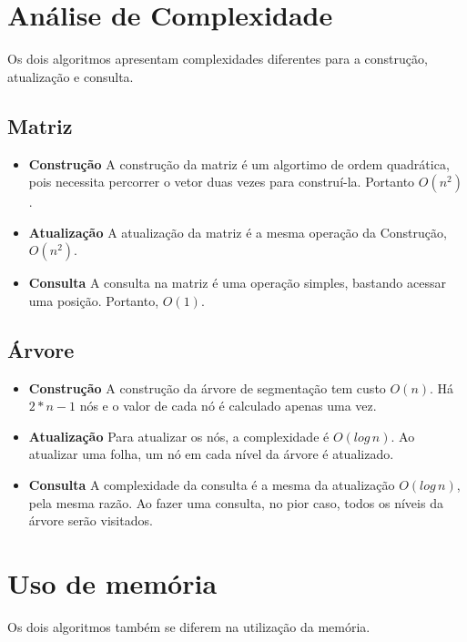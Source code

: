 \documentclass[10pt,a4paper]{article}
\begin{document}
	\section{Análise de Complexidade}

	Os dois algoritmos apresentam complexidades diferentes para a construção, atualização e consulta.

    \subsection{Matriz}

    \begin{itemize}
    	\item \textbf{Construção} A construção da matriz é um algortimo de ordem quadrática, pois necessita percorrer o vetor duas vezes para construí-la. Portanto $O(n^2)$.
    	\item \textbf{Atualização} A atualização da matriz é a mesma operação da Construção, $O(n^2)$.
    	\item \textbf{Consulta} A consulta na matriz é uma operação simples, bastando acessar uma posição. Portanto, $O(1)$.
    \end{itemize}

    \subsection{Árvore}

    \begin{itemize}
    	\item \textbf{Construção} A construção da árvore de segmentação tem custo $O(n)$. Há $2*n-1$ nós e o valor de cada nó é calculado apenas uma vez.
    	\item \textbf{Atualização} Para atualizar os nós, a complexidade é $O(log\, n)$. Ao atualizar uma folha, um nó em cada nível da árvore é atualizado.
    	\item \textbf{Consulta} A complexidade da consulta é a mesma da atualização $O(log\, n)$, pela mesma razão. Ao fazer uma consulta, no pior caso, todos os níveis da árvore serão visitados.
    \end{itemize}

    \section{Uso de memória}

    Os dois algoritmos também se diferem na utilização da memória.
\end{document}
